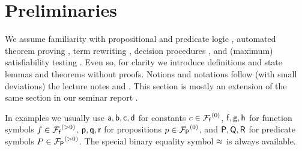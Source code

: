 
\section{Preliminaries}

We assume familiarity with propositional and predicate logic \cite{Huth:2004:LCS:975331}, 
automated theorem proving \cite{Fitting:1996:FLA:230183}, 
term rewriting \cite{Baader:1998:TR:280474}, 
decision procedures \cite{Kroening:2008:DPA:1391237}, 
and (maximum) satisfiability testing \cite{Biere:2009:HSV:1550723}.
Even so, for clarity we introduce
definitions and state lemmas and theorems without proofs.
Notions and notations follow (with small deviations) the lecture notes \cite{AM2015tr} and \cite{GM2013ar}.
This section is mostly an extension of the same section in our seminar report \cite{axm:SR2}.





In examples we usually use ${\mathsf a},{\mathsf b},{\mathsf c},{\mathsf d}$ for constants $c\in{{\mathcal F}_{\mathsf f}}^{(0)}$,
${\mathsf f},{\mathsf g},{\mathsf h}$ for function symbols $f\in{{\mathcal F}_{\mathsf f}}^{(>0)}$,
${\mathsf p},{\mathsf q},{\mathsf r}$ for propositions $p\in{{\mathcal F}_{\mathsf P}}^{(0)}$, and 
${\mathsf P},{\mathsf Q},{\mathsf R}$ for predicate symbols $P\in{{\mathcal F}_{\mathsf P}}^{(>0)}$.
The special binary equality symbol ${\mathsf \approx}$ is always available.
